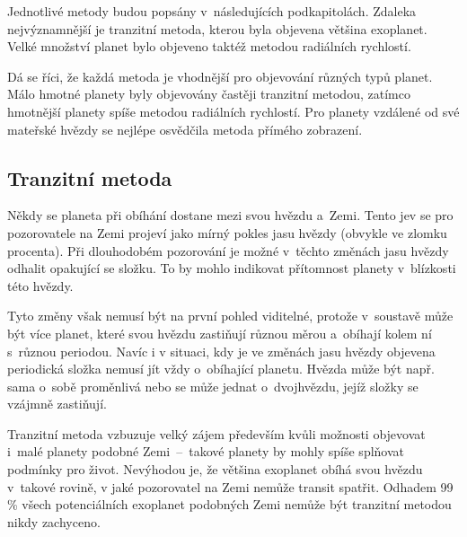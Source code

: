 \documentclass[a4paper,12pt]{article}
\begin{document}
Jednotlivé metody budou popsány v~následujících podkapitolách. Zdaleka nejvýznamnější je tranzitní metoda, kterou byla objevena většina exoplanet. Velké množství planet bylo objeveno taktéž metodou radiálních rychlostí.~\cite{nasadata}


Dá se říci, že každá metoda je vhodnější pro objevování různých typů planet. Málo hmotné planety byly objevovány častěji tranzitní metodou, zatímco hmotnější planety spíše metodou radiálních rychlostí. Pro planety vzdálené od své mateřské hvězdy se nejlépe osvědčila metoda přímého zobrazení.~\cite{nasadata}




\clearpage
\subsection{Tranzitní metoda}

Někdy se planeta při obíhání dostane mezi svou hvězdu a~Zemi. Tento jev se pro pozorovatele na Zemi projeví jako mírný pokles jasu hvězdy (obvykle ve zlomku procenta). Při dlouhodobém pozorování je možné v~těchto změnách jasu hvězdy odhalit opakující se složku. To by mohlo indikovat přítomnost planety v~blízkosti této hvězdy.~\cite{exoplanets,transit}

\drawgimp

Tyto změny však nemusí být na první pohled viditelné, protože v~soustavě může být více planet, které svou hvězdu zastiňují různou měrou a~obíhají kolem ní s~různou periodou. Navíc i v situaci, kdy je ve změnách jasu hvězdy objevena periodická složka nemusí jít vždy o~obíhající planetu. Hvězda může být např. sama o~sobě proměnlivá nebo se může jednat o~dvojhvězdu, jejíž složky se vzájmně zastiňují.~\cite{kepler80}

Tranzitní metoda vzbuzuje velký zájem především kvůli možnosti objevovat i~malé planety podobné Zemi~--~takové planety by mohly spíše splňovat podmínky pro život. Nevýhodou je, že většina exoplanet obíhá svou hvězdu v~takové rovině, v jaké pozorovatel na Zemi nemůže transit spatřit. Odhadem 99 \% všech potenciálních exoplanet podobných Zemi nemůže být tranzitní metodou nikdy zachyceno.~\cite{methods,transit}
\end{document}
